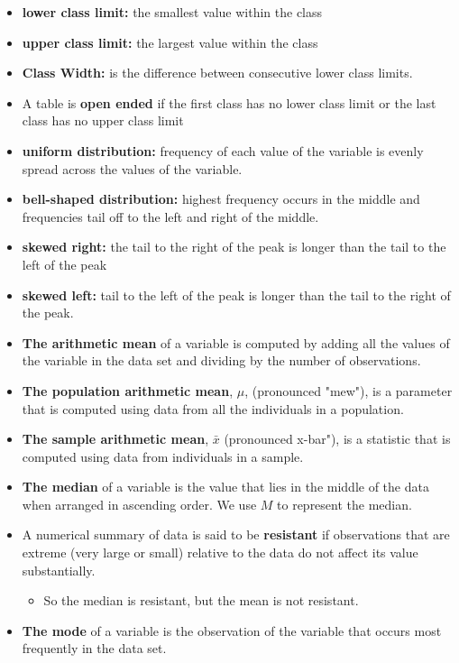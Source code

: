 \documentclass{report}
\begin{document}
\begin{itemize}
            \item \textbf{lower class limit:} the smallest value within the class 
            \item \textbf{upper class limit:} the largest value within the class 
            \item \textbf{Class Width: }  is the difference between consecutive lower class limits.
            \item A table is \textbf{open ended} if the first class has no lower class limit or the last class has no upper class limit
            \item \textbf{uniform distribution:} frequency of each value of the variable is evenly spread across the values of the variable. 
            \item \textbf{bell-shaped distribution:} highest frequency occurs in the middle and frequencies tail off to the left and right of the middle.
            \item \textbf{skewed right:} the tail to the right of the peak is longer than the tail to the left of the peak
            \item \textbf{skewed left:} tail to the left of the peak is longer than the tail to the right of the peak.
            \item \textbf{The arithmetic mean} of a variable is computed by adding all the values of the variable in the data set and dividing by the number of observations.
            \item \textbf{The population arithmetic mean}, $\mu$, (pronounced "mew"), is a parameter that is computed using data from all the individuals in a population.
            \item \textbf{The sample arithmetic mean}, $\bar{x}$ (pronounced x-bar"), is a statistic that is computed using data from individuals in a sample.
            \item \textbf{The median} of a variable is the value that lies in the middle of the data when arranged in ascending order. We use $M$  to represent the median.
            \item A numerical summary of data is said to be \textbf{resistant} if observations that are extreme (very large or small) relative to the data do not affect its value substantially.
                \begin{itemize}
                    \item So the median is resistant, but the mean is not resistant.
                \end{itemize}
            \item \textbf{The mode} of a variable is the observation of the variable that occurs most frequently in the data set.

\end{itemize}
\end{document}
